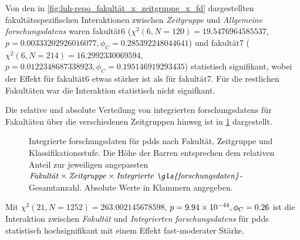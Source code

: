 Von den in \cref{fig:luh-repo_fakultät_x_zeitgruppe_x_fd} dargestellten fakultätsspezifischen Interaktionen zwischen \textit{Zeitgruppe} und \textit{Allgemeine \glspl{forschungsdaten}} waren \gls{fakultät6} ($\chi^2 (\num{6}, N = \num{120}) = \num[round-mode=places,round-precision=2]{19.5476964585537}$, $p = \num[round-mode=places,round-precision=2]{0.00333202926016077},\phi_C=\num[round-mode=places,round-precision=2]{0.285392248044641}$) und \gls{fakultät7} ($\chi^2 (\num{6}, N = \num{214}) = \num[round-mode=places,round-precision=2]{16.2992330069594}$, $p = \num[round-mode=places,round-precision=2]{0.0122348687338923},\phi_C=\num[round-mode=places,round-precision=2]{0.195146919293435}$) statistisch signifikant, wobei der Effekt für \gls{fakultät6} etwas stärker ist als für \gls{fakultät7}. Für die restlichen Fakultäten war die Interaktion statistisch nicht signifkant.

Die relative und absolute Verteilung von integrierten \glspl{forschungsdaten} für Fakultäten über die verschiedenen Zeitgruppen hinweg ist in \cref{fig:luh-repo_fakultät_x_zeitgruppe_x_intern-fd} dargestellt.
\begin{figure}[!htbp]
    \resizebox{\ifdim\width>\textwidth\textwidth\else\width\fi}{!}{}
    \caption{Integrierte \gls{forschungsdaten} für \glspl{pdd} nach Fakultät, Zeitgruppe und Klassifikationsstufe.
    Die Höhe der Barren entsprechen dem relativen Anteil zur jeweiligen angepassten $\text{\textit{Fakultät}}\times\text{\textit{Zeitgruppe}}\times\text{\textit{Integrierte \gls{forschungsdaten}}}$-Gesamtanzahl.
    Absolute Werte in Klammern angegeben.}
    \label{fig:luh-repo_fakultät_x_zeitgruppe_x_intern-fd}
\end{figure}
Mit $\chi^2 (\num{21}, N = \num{1252}) = \num[round-mode=places,round-precision=2]{263.002145678598}$, $p = \num[round-mode=places,round-precision=2]{9.94476930299567E-44},\phi_C=\num[round-mode=places,round-precision=2]{0.264616459279196}$ ist die Interaktion zwischen \textit{Fakultät} und \textit{Integrierten \glspl{forschungsdaten}} für \glspl{pdd} statistisch hochsignifikant mit einem Effekt fast-moderater Stärke.

